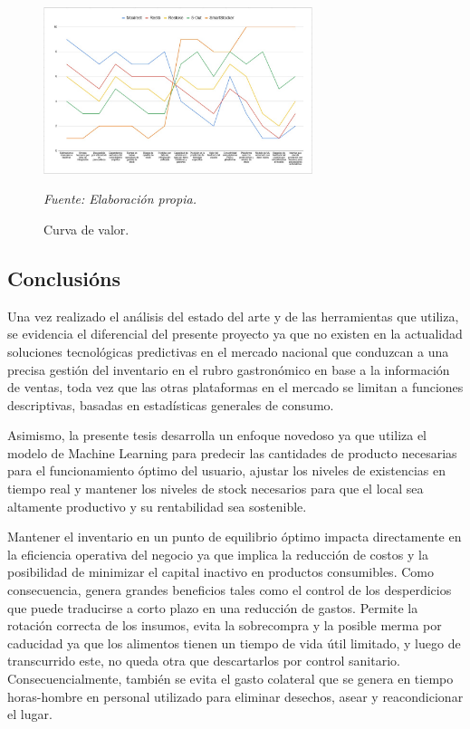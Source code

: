 \begin{figure}[htbp]
    \centering
    \includegraphics[width=0.7\textwidth]{images/curvaValor.jpeg}
    \caption{Curva de valor.}
    {\textit{Fuente: Elaboración propia.}}
    \label{fig:curva}
\end{figure}

\FloatBarrier

\subsection{Conclusións}\label{sec:sintesis-estado}

Una vez realizado el análisis del estado del arte y de las herramientas que utiliza, se evidencia el diferencial del presente proyecto ya que no existen en la actualidad soluciones tecnológicas predictivas en el mercado nacional que conduzcan a una precisa gestión del inventario en el rubro gastronómico en base a la información de ventas, toda vez que las otras plataformas en el mercado se limitan a funciones descriptivas, basadas en estadísticas generales de consumo.

Asimismo, la presente tesis desarrolla un enfoque novedoso ya que utiliza el modelo de Machine Learning para predecir las cantidades de producto necesarias para el funcionamiento óptimo del usuario, ajustar los niveles de existencias en tiempo real y mantener los niveles de stock necesarios para que el local sea altamente productivo y su rentabilidad sea sostenible.

Mantener el inventario en un punto de equilibrio óptimo impacta directamente en la eficiencia operativa del negocio ya que implica la reducción de costos y la posibilidad de minimizar el capital inactivo en productos consumibles. Como consecuencia, genera grandes beneficios tales como el control de los desperdicios que puede traducirse a corto plazo en una reducción de gastos. Permite la rotación correcta de los insumos, evita la sobrecompra y la posible merma por caducidad ya que los alimentos tienen un tiempo de vida útil limitado, y luego de transcurrido este, no queda otra que descartarlos por control sanitario. Consecuencialmente, también se evita el gasto colateral que se genera en tiempo horas-hombre en personal utilizado para eliminar desechos, asear y reacondicionar el lugar.

